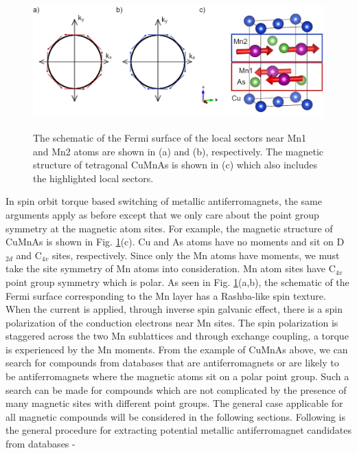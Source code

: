 \documentclass[10pt,doublespacing,edeposit]{uiucthesis2020}
\begin{document}
\begin{mainmatter}
\begin{figure}
\centering\includegraphics[width=\columnwidth]{figures/ch2/wadley_1.png} \\
\caption{\label{fig:wadley_1}
The schematic of the Fermi surface of the local sectors near Mn1 and Mn2 atoms are shown in (a) and (b), respectively. The magnetic structure of tetragonal CuMnAs is shown in (c) which also includes the highlighted local sectors.
}
\end{figure}


In spin orbit torque based switching of metallic antiferromagnets, the same arguments apply as before except that we only care about the point group symmetry at the magnetic atom sites. For example, the magnetic structure of CuMnAs is shown in Fig. \ref{fig:wadley_1}(c). Cu and As atoms have no moments and sit on D$_{2d}$ and C$_{4v}$ sites, respectively. Since only the Mn atoms have moments, we must take the site symmetry of Mn atoms into consideration. Mn atom sites have C$_{4v}$ point group symmetry which is polar. As seen in Fig. \ref{fig:wadley_1}(a,b), the schematic of the Fermi surface corresponding to the Mn layer has a Rashba-like spin texture. When the current is applied, through inverse spin galvanic effect, there is a spin polarization of the conduction electrons near Mn sites. The spin polarization is staggered across the two Mn sublattices and through exchange coupling, a torque is experienced by the Mn moments. From the example of CuMnAs above, we can search for compounds from databases that are antiferromagnets or are likely to be antiferromagnets where the magnetic atoms sit on a polar point group. Such a search can be made for compounds which are not complicated by the presence of many magnetic sites with different point groups. The general case applicable for all magnetic compounds will be considered in the following sections. Following is the general procedure for extracting potential metallic antiferromagnet candidates from databases -


\end{mainmatter}
\end{document}
